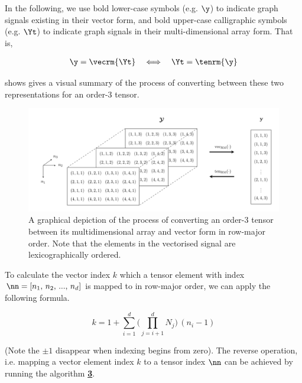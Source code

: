 In the following, we use bold lower-case symbols (e.g. $\y$) to indicate graph signals existing in their vector form, and bold upper-case calligraphic symbols (e.g. $\Yt$) to indicate graph signals in their multi-dimensional array form. That is, 

\begin{align*}
    \y = \vecrm{\Yt} \quad \Longleftrightarrow \quad \Yt  = \tenrm{\y}
\end{align*}

 shows gives a visual summary of the process of converting between these two representations for an order-3 tensor. 


\begin{figure}[t]
    \begin{center}
        \includegraphics[width=\linewidth]{Figures/Tensor_Digaram.pdf}    
    \end{center}
    \caption[Conversion between a multidimensional array and a vector]{A graphical depiction of the process of converting an order-3 tensor between its multidimensional array and vector form in row-major order. Note that the elements in the vectorised signal are lexicographically ordered. }
    \label{fig:ten_to_vec}
\end{figure}


To calculate the vector index $k$ which a tensor element with index $\nn = [n_1,\, n_2,\, ...,\, n_d]$ is mapped to in row-major order, we can apply the following formula.  

\begin{equation}
    \label{eq:vec}
    k = 1 + \sum_{i=1}^d \Big( \prod_{j=i+1}^d N_j \Big) \, (n_i - 1)
\end{equation}

(Note the $\pm1$ disappear when indexing begins from zero). The reverse operation, i.e. mapping a vector element index $k$ to a tensor index $\nn$ can be achieved by running the algorithm \hyperlink{vectoten}{\textbf{3}}. 


